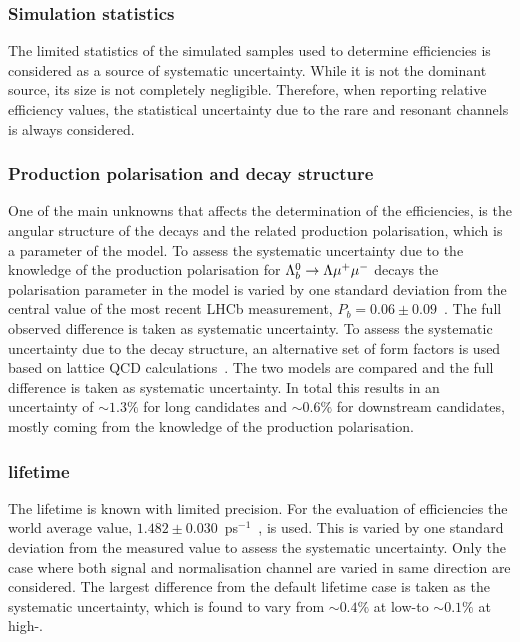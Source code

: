 \subsubsection{Simulation statistics}

The limited statistics of the simulated samples used to determine efficiencies is considered as a source of systematic uncertainty.
While it is not the dominant source, its size is not completely negligible.
Therefore, when reporting relative efficiency values, the statistical uncertainty due to the  
rare and resonant channels is always considered. 

\subsubsection{Production polarisation and decay structure}
\label{sec:BRpolsys}

One of the main unknowns that affects the determination of the efficiencies, is the angular structure of
the decays and the related production polarisation, which is a parameter of the model.
%
To assess the systematic uncertainty due to the knowledge of the production polarisation for $\Lambda^0_b\rightarrow\Lambda\mu^+\mu^-$ decays
the polarisation parameter in the model is varied by one standard deviation from the central value of the
most recent LHCb measurement, $P_b = 0.06 \pm 0.09$~\cite{Aaij:2013oxa}. The full observed difference is
taken as systematic uncertainty. To assess the systematic uncertainty due to the decay structure,
an alternative set of form factors is used based on lattice QCD calculations~\cite{Detmold:2012vy}. 
The two models are compared and the full difference is taken as systematic uncertainty.
%
In total this results in an uncertainty of $\sim 1.3\%$ for long candidates and $\sim 0.6\%$ for downstream
candidates, mostly coming from the knowledge of the production polarisation.

\subsubsection{\Lb lifetime}

The \Lb lifetime is known with limited precision. For the evaluation of efficiencies the
world average value, $1.482\pm0.030$~ps$^{-1}$~\cite{Aaij:2013oha}, is used. This is
varied by one standard deviation from the measured value to assess the systematic uncertainty.
Only the case where both signal and normalisation channel are varied in same direction are considered.
The largest difference from the default lifetime case is taken as the systematic uncertainty,
which is found to vary from $\sim 0.4\%$ at low-\qsq to $\sim 0.1\%$ at high-\qsq.

